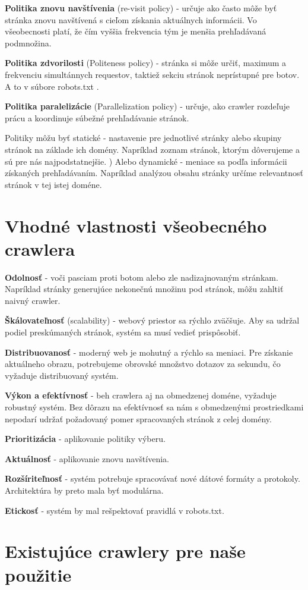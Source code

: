 \textbf{Politika znovu navštívenia} (re-visit policy) - určuje ako často môže byť stránka znovu navštívená s cieľom získania aktuálnych informácii. Vo všeobecnosti platí, že čím vyššia frekvencia tým je menšia prehľadávaná podmnožina. 

\textbf{Politika zdvorilosti} (Politeness policy) - stránka si môže určiť, maximum a frekvenciu simultánnych requestov, taktiež sekciu stránok neprístupné pre botov. A to v súbore robots.txt \cite{robotsTxt}. 

\textbf{Politika paralelizácie} (Parallelization policy) - určuje, ako crawler rozdeľuje prácu a koordinuje súbežné prehľadávanie stránok. 

Politiky môžu byť statické - nastavenie pre jednotlivé stránky alebo skupiny stránok na základe ich domény. Napríklad zoznam stránok, ktorým dôverujeme a sú pre nás najpodstatnejšie. )
Alebo dynamické - meniace sa podľa informácii získaných prehľadávaním. Napríklad analýzou obsahu stránky určíme relevantnosť stránok v tej istej doméne. 




\section{Vhodné vlastnosti všeobecného crawlera}

\textbf{Odolnosť} - voči pasciam proti botom alebo zle nadizajnovaným stránkam. Napríklad stránky generujúce nekonečnú množinu pod stránok, môžu zahltiť naivný crawler. 

\textbf{Škálovateľnosť} (scalability) - webový priestor sa rýchlo zväčšuje. Aby sa udržal podiel preskúmaných stránok, systém sa musí 
vedieť prispôsobiť. 

\textbf{Distribuovanosť} -  moderný web je mohutný a rýchlo sa meniaci. Pre získanie aktuálneho obrazu, potrebujeme obrovské množstvo dotazov za sekundu, čo vyžaduje distribuovaný systém. 

\textbf{Výkon a efektívnosť} - beh crawlera aj na obmedzenej doméne, vyžaduje robustný systém. Bez dôrazu na efektívnosť sa nám s obmedzenými prostriedkami nepodarí udržať požadovaný pomer spracovaných stránok z celej domény.

\textbf{Prioritizácia} - aplikovanie politiky výberu.

\textbf{Aktuálnosť} - aplikovanie znovu navštívenia.

\textbf{Rozšíriteľnosť} - systém potrebuje spracovávať nové dátové formáty a protokoly. Architektúra by preto mala byť modulárna. 

\textbf{Etickosť} - systém by mal rešpektovať pravidlá v robots.txt.


\section{Existujúce crawlery pre naše použitie} 
